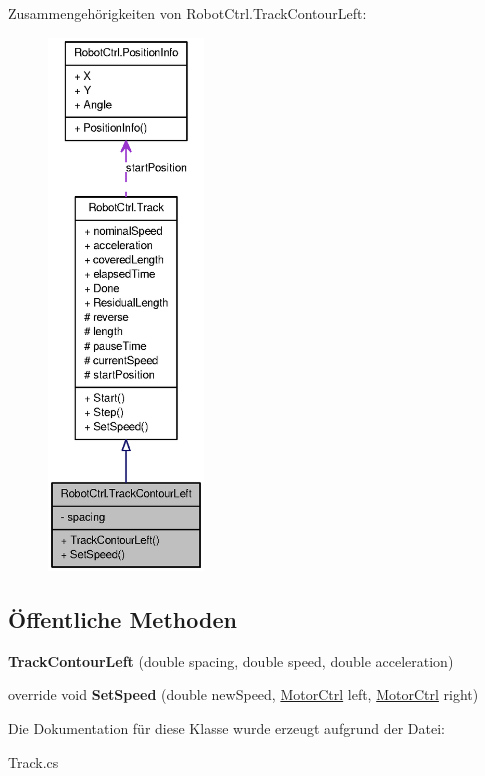 Zusammengehörigkeiten von RobotCtrl.TrackContourLeft:\nopagebreak
\begin{figure}[H]
\begin{center}
\leavevmode
\includegraphics[height=400pt]{class_robot_ctrl_1_1_track_contour_left__coll__graph}
\end{center}
\end{figure}
\subsection*{Öffentliche Methoden}
\begin{DoxyCompactItemize}
\item 
\hypertarget{class_robot_ctrl_1_1_track_contour_left_a73c01532abc01420c2a35bea80be194d}{
{\bfseries TrackContourLeft} (double spacing, double speed, double acceleration)}
\label{class_robot_ctrl_1_1_track_contour_left_a73c01532abc01420c2a35bea80be194d}

\item 
\hypertarget{class_robot_ctrl_1_1_track_contour_left_ae7938250af614625cd08a498c0f15195}{
override void {\bfseries SetSpeed} (double newSpeed, \hyperlink{class_robot_ctrl_1_1_motor_ctrl}{MotorCtrl} left, \hyperlink{class_robot_ctrl_1_1_motor_ctrl}{MotorCtrl} right)}
\label{class_robot_ctrl_1_1_track_contour_left_ae7938250af614625cd08a498c0f15195}

\end{DoxyCompactItemize}


Die Dokumentation für diese Klasse wurde erzeugt aufgrund der Datei:\begin{DoxyCompactItemize}
\item 
Track.cs\end{DoxyCompactItemize}
